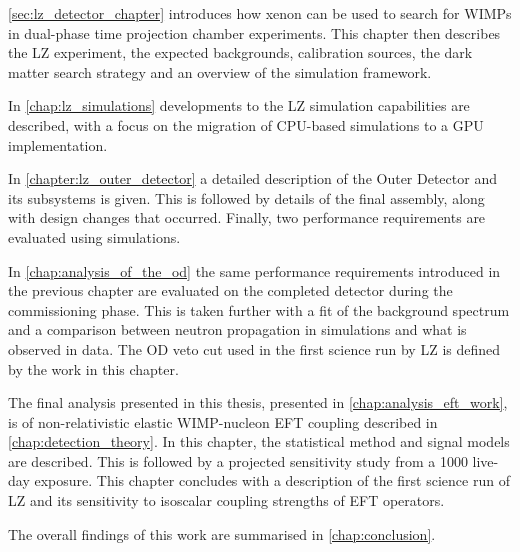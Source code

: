 \par
\autoref{sec:lz_detector_chapter} introduces how xenon can be used to search for WIMPs in dual-phase time projection chamber experiments.
This chapter then describes the LZ experiment, the expected backgrounds, calibration sources, the dark matter search strategy and an overview of the simulation framework.

\par
In \autoref{chap:lz_simulations} developments to the LZ simulation capabilities are described, with a focus on the migration of CPU-based simulations to a GPU implementation.

\par
In \autoref{chapter:lz_outer_detector} a detailed description of the Outer Detector and its subsystems is given.
This is followed by details of the final assembly, along with design changes that occurred.
Finally, two performance requirements are evaluated using simulations.

\par
In \autoref{chap:analysis_of_the_od} the same performance requirements introduced in the previous chapter are evaluated on the completed detector during the commissioning phase.
This is taken further with a fit of the background spectrum and a comparison between neutron propagation in simulations and what is observed in data.
The OD veto cut used in the first science run by LZ is defined by the work in this chapter.

\par
The final analysis presented in this thesis, presented in \autoref{chap:analysis_eft_work}, is of non-relativistic elastic WIMP-nucleon EFT coupling described in \autoref{chap:detection_theory}.
In this chapter, the statistical method and signal models are described.
This is followed by a projected sensitivity study from a 1000 live-day exposure.
This chapter concludes with a description of the first science run of LZ and its sensitivity to isoscalar coupling strengths of EFT operators.

\par
The overall findings of this work are summarised in \autoref{chap:conclusion}.